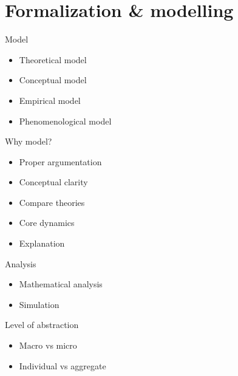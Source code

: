 \documentclass[notes=hide,compress]{beamer}
\begin{document}
\section{Formalization \& modelling}
\begin{frame}[c]{Model}
  \centering
  \parbox{5cm}{
    \begin{itemize}
      \item Theoretical model
      \item Conceptual model
      \item Empirical model
      \item Phenomenological model
    \end{itemize}
  }
\end{frame}
\begin{frame}[c]{Why model?}
  \centering
  \parbox{4cm}{
    \begin{itemize}
      \item Proper argumentation
      \item Conceptual clarity
      \item Compare theories 
      \item Core dynamics
      \item Explanation
    \end{itemize}
  }
\end{frame}
\begin{frame}[c]{Analysis}
  \centering
  \parbox{4cm}{
    \begin{itemize}
      \item Mathematical analysis
      \item Simulation
    \end{itemize}
  }
\end{frame}
\begin{frame}[c]{Level of abstraction}
  \centering
  \parbox{5cm}{
    \begin{itemize}
      \item Macro vs micro
      \item Individual vs aggregate
    \end{itemize}
  }
\end{frame}
\end{document}
